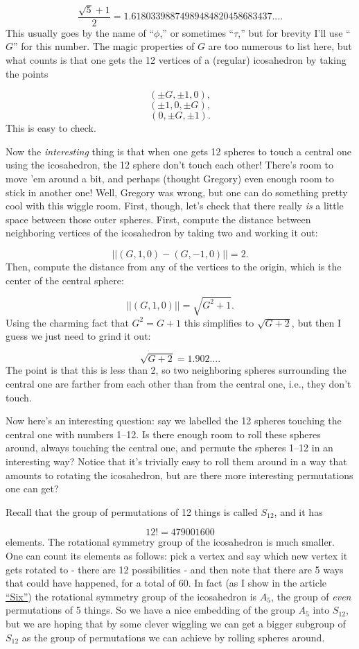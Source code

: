 \[ \frac{\sqrt{5} + 1}{2} = 1.61803398874989484820458683437....\]
This usually goes by the name of ``$\phi$,'' or sometimes ``$\tau$,'' but for brevity I'll use ``$G$'' for this number. The magic properties of $G$ are too numerous to list here, but what counts is that one gets the 12 vertices of a (regular) icosahedron by taking the points

\[                (\pm G, \pm 1, 0),\]
\[                (\pm 1, 0, \pm G),\]
\[                (0, \pm G, \pm 1).\]
This is easy to check.

Now the \emph{interesting} thing is that when one gets 12 spheres to touch a central one using the icosahedron, the 12 sphere don't touch each other! There's room to move 'em around a bit, and perhaps (thought Gregory) even enough room to stick in another one! Well, Gregory was wrong, but one can do something pretty cool with this wiggle room. First, though, let's check that there really \emph{is} a little space between those outer spheres. First, compute the distance between neighboring vertices of the icosahedron by taking two and working it out:

\[               ||(G,1,0) - (G,-1,0)|| = 2.\]
Then, compute the distance from any of the vertices to the origin, which is the center of the central sphere:

\[               ||(G,1,0)|| = \sqrt{G^2 + 1}.\]
Using the charming fact that $G^2 = G + 1$ this simplifies to $\sqrt{G + 2}$, but then I guess we just need to grind it out:

\[ \sqrt{G + 2} =  1.902....\]
The point is that this is less than 2, so two neighboring spheres surrounding the central one are farther from each other than from the central one, i.e., they don't touch.

Now here's an interesting question: say we labelled the 12 spheres touching the central one with numbers 1--12. Is there enough room to roll these spheres around, always touching the central one, and permute the spheres 1--12 in an interesting way? Notice that it's trivially easy to roll them around in a way that amounts to rotating the icosahedron, but are there more interesting permutations one can get?

Recall that the group of permutations of 12 things is called $S_{12}$, and it has

\[ 12! = 479001600\]
elements. The rotational symmetry group of the icosahedron is much smaller. One can count its elements as follows: pick a vertex and say which new vertex it gets rotated to - there are 12 possibilities - and then note that there are 5 ways that could have happened, for a total of 60. In fact (as I show in the article \href{http://math.ucr.edu/home/baez/six.html}{``Six''}) the rotational symmetry group of the icosahedron is $A_5$, the group of \emph{even} permutations of 5 things. So we have a nice embedding of the group $A_5$ into $S_{12}$, but we are hoping that by some clever wiggling we can get a bigger subgroup of $S_{12}$ as the group of permutations we can achieve by rolling spheres around.

